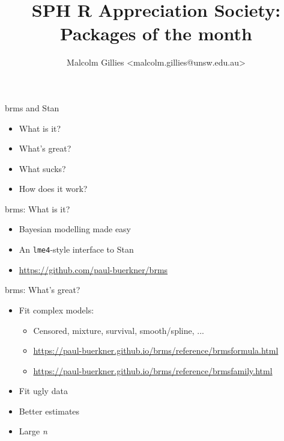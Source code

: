 \documentclass[aspectratio=169,12pt]{beamer} %
\title{SPH R Appreciation Society:\\Packages of the month}
\author{Malcolm Gillies <malcolm.gillies@unsw.edu.au>}
\institute{9 October 2023}
\begin{document}

\begin{frame}[plain]
\titlepage
\end{frame}

\begin{frame}{brms and Stan}
	\begin{itemize}
		\item What is it?
		\item What's great?
		\item What sucks?
		\item How does it work?
	\end{itemize}
\end{frame}

\begin{frame}{brms: What is it?}
	\begin{itemize}
		\item Bayesian modelling made easy
		\item An \texttt{lme4}-style interface to Stan
		\item \url{https://github.com/paul-buerkner/brms}
	\end{itemize}
\end{frame}

\begin{frame}{brms: What's great?}
	\begin{itemize}
		\item Fit complex models:
		\begin{itemize}
			\item Censored, mixture, survival, smooth/spline, ...
			\item \scriptsize{\url{https://paul-buerkner.github.io/brms/reference/brmsformula.html}}
			\item \scriptsize{\url{https://paul-buerkner.github.io/brms/reference/brmsfamily.html}}
		\end{itemize}
		\item Fit ugly data
		\item Better estimates
		\item Large \emph{n}
	\end{itemize}
\end{frame}
\end{document}
